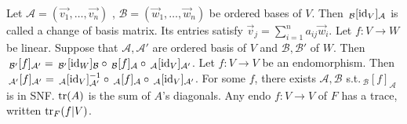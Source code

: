  Let $\mathcal{A} = (\vec{v_1}, \dots, \vec{v_n})$ , $\mathcal{B} = (\vec{w}_1, \dots, \vec{w}_n)$ be ordered bases of $V$. Then $\,_\mathcal{B}[\text{id}_V]_\mathcal{A}$ is called a change of basis matrix. Its entries satisfy $\vec{v}_j = \sum_{i=1}^n a_{ij}\vec{w}_i$.
 Let $f : V \to W$ be linear. Suppose that $\mathcal{A}, \mathcal{A}'$ are ordered basis of $V$ and $\mathcal{B}, \mathcal{B}'$ of $W$. Then $\,_{\mathcal{B}'}[f]_{\mathcal{A}'} = \,_{\mathcal{B}'}[\text{id}_W]_{\mathcal{B}} \circ \,_{\mathcal{B}}[f]_{\mathcal{A}} \circ \,_{\mathcal{A}}[\text{id}_V]_{\mathcal{A}'}$.
 Let $f : V \to V$ be an endomorphism. Then $\,_{\mathcal{A}'}[f]_{\mathcal{A}'} = \,_{\mathcal{A}}[\text{id}_V]_{\mathcal{A}'}^{-1} \circ \,_{\mathcal{A}}[f]_{\mathcal{A}} \circ \,_{\mathcal{A}}[\text{id}_V]_{\mathcal{A}'}$.
 For some $f$, there exists $\mathcal{A}, \mathcal{B}$ s.t.\@ $\,_{\mathcal{B}}[f]_{\mathcal{A}}$ is in SNF.
 $\text{tr}(A)$ is the sum of $A$'s diagonals. Any endo $f : V \to V$ of $F$ has a trace, written $\text{tr}_F(f|V)$.
